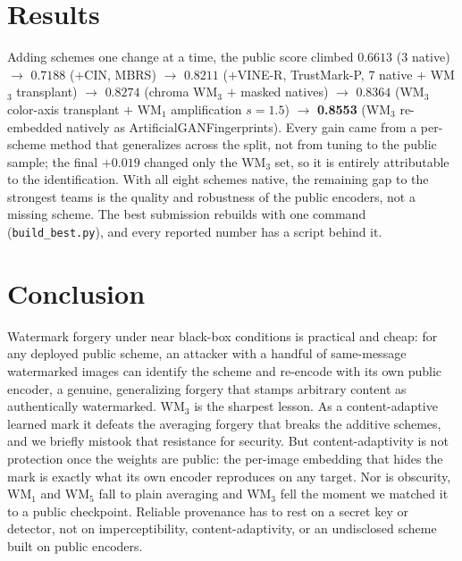 \documentclass{article} %
\newcommand{\bestscore}{0.8553}
\begin{document}
\section{Results}
Adding schemes one change at a time, the public score climbed
$0.6613$ (3 native) $\rightarrow$ $0.7188$ ($+$CIN, MBRS) $\rightarrow$ $0.8211$ ($+$VINE-R, TrustMark-P, 7
native $+$ WM$_3$ transplant) $\rightarrow$ $0.8274$ (chroma WM$_3$ $+$ masked natives) $\rightarrow$ $0.8364$
(WM$_3$ color-axis transplant $+$ WM$_1$ amplification $s{=}1.5$) $\rightarrow$ \textbf{\bestscore} (WM$_3$
re-embedded natively as ArtificialGANFingerprints). Every gain came from a per-scheme method that generalizes
across the split, not from tuning to the public sample; the final $+0.019$ changed only the WM$_3$ set, so it
is entirely attributable to the identification. With all eight schemes native, the remaining gap to the
strongest teams is the quality and robustness of the public encoders, not a missing scheme. The best
submission rebuilds with one command (\texttt{build\_best.py}), and every reported number has a script behind
it.

\section{Conclusion}
Watermark forgery under near black-box conditions is practical and cheap: for any deployed public scheme, an
attacker with a handful of same-message watermarked images can identify the scheme and re-encode with its own
public encoder, a genuine, generalizing forgery that stamps arbitrary content as authentically watermarked.
WM$_3$ is the sharpest lesson. As a content-adaptive learned mark it defeats the averaging forgery that breaks
the additive schemes, and we briefly mistook that resistance for security. But content-adaptivity is not
protection once the weights are public: the per-image embedding that hides the mark is exactly what its own
encoder reproduces on any target. Nor is obscurity, WM$_1$ and WM$_5$ fall to plain averaging and WM$_3$ fell
the moment we matched it to a public checkpoint. Reliable provenance has to rest on a secret key or detector,
not on imperceptibility, content-adaptivity, or an undisclosed scheme built on public encoders.
\end{document}

